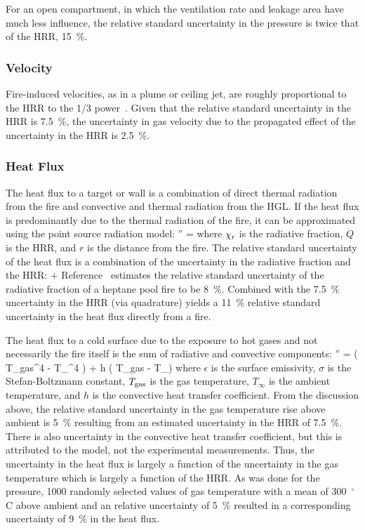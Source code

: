 For an open compartment, in which the ventilation rate and leakage area have much less influence, the relative standard uncertainty in the pressure is twice that of the HRR, 15~\%.

\subsubsection{Velocity}

Fire-induced velocities, as in a plume or ceiling jet, are roughly proportional to the HRR to the 1/3 power~\cite{SFPE:Alpert}. Given that the relative standard uncertainty in the HRR is 7.5~\%, the uncertainty in gas velocity due to the propagated effect of the uncertainty in the HRR is 2.5~\%.

\subsubsection{Heat Flux}

The heat flux to a target or wall is a combination of direct thermal radiation from the fire and convective and thermal radiation from the HGL. If the heat flux is predominantly due to the thermal radiation of the fire, it can be approximated using the point source radiation model:
\be
   '' = 
\ee
where $\chi_{\rm r}$ is the radiative fraction, $\dot{Q}$ is the HRR, and $r$ is the distance from the fire. The relative standard uncertainty of the heat flux is a combination of the uncertainty in the radiative fraction and the HRR:
\be
    \approx {} + 
\ee
Reference~\cite{Hamins:SP1013-1} estimates the relative standard uncertainty of the radiative fraction of a heptane pool fire to be 8~\%. Combined with the 7.5~\% uncertainty in the HRR (via quadrature) yields a 11~\% relative standard uncertainty in the heat flux directly from a fire.

The heat flux to a cold surface due to the exposure to hot gases and not necessarily the fire itself is the sum of radiative and convective components:
\be
   '' = \epsilon \sigma \left( T_{\rm gas}^4 - T_\infty^4 \right) + h \left( T_{\rm gas} - T_\infty \right)
\ee
where $\epsilon$ is the surface emissivity, $\sigma$ is the Stefan-Boltzmann constant, $T_{\rm gas}$  is the gas temperature, $T_\infty$ is the ambient temperature, and $h$ is the convective heat transfer coefficient. From the discussion above, the relative standard uncertainty in the gas temperature rise above ambient is 5~\% resulting from an estimated uncertainty in the HRR of 7.5~\%. There is also uncertainty in the convective heat transfer coefficient, but this is attributed to the model, not the experimental measurements. Thus, the uncertainty in the heat flux is largely a function of the uncertainty in the gas temperature which is largely a function of the HRR. As was done for the pressure, 1000 randomly selected values of gas temperature with a mean of 300~$^\circ$C above ambient and an relative uncertainty of 5~\% resulted in a corresponding uncertainty of 9~\% in the heat flux.

